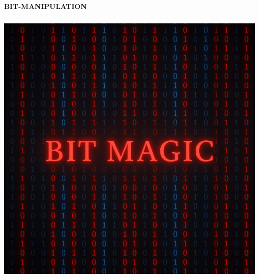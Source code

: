 \documentclass[a4paper,10pt]{book}
\begin{document}
\begin{center}

{\fontsize{55}{20}\selectfont \textcolor{headingcolor}{\bfseries BIT-MANIPULATION}}
\end{center}

\vspace{50mm}

\begin{center}
\includegraphics[height=13.88cm, width=17cm, keepaspectratio]{Pics/bits.png}
\end{center}
\end{document}
